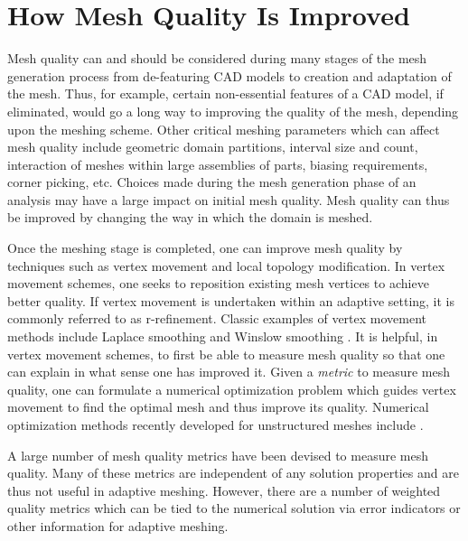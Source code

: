\section{How Mesh Quality Is Improved}
Mesh quality can and should be considered during many stages of 
the mesh generation process from de-featuring CAD models to  
creation and adaptation of the mesh. Thus, for example, certain
non-essential features of a CAD model, if eliminated, would go a 
long way to improving the quality of the mesh, depending upon
the meshing scheme. Other critical meshing parameters which can 
affect mesh quality include geometric domain partitions, interval size
and count, interaction of meshes within large assemblies of parts, 
biasing requirements, corner picking, etc. Choices made during the 
mesh generation phase of an analysis may have a large impact on 
initial mesh quality.  Mesh quality can thus be improved by changing the 
way in which the domain is meshed. \newline

Once the meshing stage is completed, one can improve mesh quality
by techniques such as vertex movement and local topology modification.
In vertex movement schemes, one seeks to reposition existing mesh vertices to 
achieve better quality. If vertex movement is undertaken within an adaptive 
setting, it is commonly referred to as r-refinement. 
Classic examples of vertex movement methods 
include Laplace smoothing \cite{F88} and Winslow smoothing \cite{Winslow}. 
It is helpful, in vertex movement schemes, to first be 
able to measure mesh quality so that one can explain in what sense one 
has improved it. Given a {\it metric} to measure mesh quality, 
one can formulate a numerical 
optimization problem which guides vertex movement to find the optimal 
mesh and thus improve its quality.  Numerical 
optimization methods recently
developed for unstructured meshes include \cite{Opt-MS,Kn00,FrKn01,
FeasNewt,bjoe:swap,bjoe:chain-swap,es92}. \newline

A large number of mesh quality metrics have been devised to measure 
mesh quality. Many of these metrics are independent of any solution 
properties and are thus not useful in adaptive meshing. However, there
are a number of weighted quality metrics which can be tied to the 
numerical solution via error indicators or other information for adaptive 
meshing. \newline

